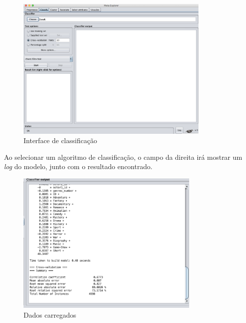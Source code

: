 \begin{figure}[H]
\centering
\includegraphics[height=7cm]{imagens/weka.png}
\caption{Interface de classificação}
\label{classificationinterface}
\end{figure}

Ao selecionar um algoritmo de classificação, o campo da direita irá mostrar um \textit{log} do modelo, junto com o resultado encontrado.
\begin{figure}[H]
\centering
\includegraphics[height=7cm]{imagens/wekauotput.png}
\caption{Dados carregados}
\label{figura23}
\end{figure}